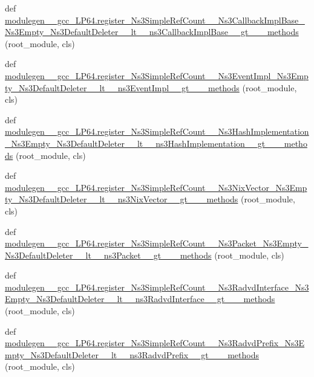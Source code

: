 \begin{DoxyCompactItemize}
\item 
def \hyperlink{namespacemodulegen____gcc__LP64_abad80b77479df17974cc787f14a2406f}{modulegen\+\_\+\+\_\+gcc\+\_\+\+L\+P64.\+register\+\_\+\+Ns3\+Simple\+Ref\+Count\+\_\+\+\_\+\+Ns3\+Callback\+Impl\+Base\+\_\+\+Ns3\+Empty\+\_\+\+Ns3\+Default\+Deleter\+\_\+\+\_\+lt\+\_\+\+\_\+ns3\+Callback\+Impl\+Base\+\_\+\+\_\+gt\+\_\+\+\_\+\+\_\+methods} (root\+\_\+module, cls)
\item 
def \hyperlink{namespacemodulegen____gcc__LP64_a0545c365b0db77cf144c477216b1292c}{modulegen\+\_\+\+\_\+gcc\+\_\+\+L\+P64.\+register\+\_\+\+Ns3\+Simple\+Ref\+Count\+\_\+\+\_\+\+Ns3\+Event\+Impl\+\_\+\+Ns3\+Empty\+\_\+\+Ns3\+Default\+Deleter\+\_\+\+\_\+lt\+\_\+\+\_\+ns3\+Event\+Impl\+\_\+\+\_\+gt\+\_\+\+\_\+\+\_\+methods} (root\+\_\+module, cls)
\item 
def \hyperlink{namespacemodulegen____gcc__LP64_a38845cc78a4819d6d5632f27e6fd34d9}{modulegen\+\_\+\+\_\+gcc\+\_\+\+L\+P64.\+register\+\_\+\+Ns3\+Simple\+Ref\+Count\+\_\+\+\_\+\+Ns3\+Hash\+Implementation\+\_\+\+Ns3\+Empty\+\_\+\+Ns3\+Default\+Deleter\+\_\+\+\_\+lt\+\_\+\+\_\+ns3\+Hash\+Implementation\+\_\+\+\_\+gt\+\_\+\+\_\+\+\_\+methods} (root\+\_\+module, cls)
\item 
def \hyperlink{namespacemodulegen____gcc__LP64_a965e9b7942715fc406cf9c83246b2bcb}{modulegen\+\_\+\+\_\+gcc\+\_\+\+L\+P64.\+register\+\_\+\+Ns3\+Simple\+Ref\+Count\+\_\+\+\_\+\+Ns3\+Nix\+Vector\+\_\+\+Ns3\+Empty\+\_\+\+Ns3\+Default\+Deleter\+\_\+\+\_\+lt\+\_\+\+\_\+ns3\+Nix\+Vector\+\_\+\+\_\+gt\+\_\+\+\_\+\+\_\+methods} (root\+\_\+module, cls)
\item 
def \hyperlink{namespacemodulegen____gcc__LP64_ad03a2df5680530337afef71c06f6d20d}{modulegen\+\_\+\+\_\+gcc\+\_\+\+L\+P64.\+register\+\_\+\+Ns3\+Simple\+Ref\+Count\+\_\+\+\_\+\+Ns3\+Packet\+\_\+\+Ns3\+Empty\+\_\+\+Ns3\+Default\+Deleter\+\_\+\+\_\+lt\+\_\+\+\_\+ns3\+Packet\+\_\+\+\_\+gt\+\_\+\+\_\+\+\_\+methods} (root\+\_\+module, cls)
\item 
def \hyperlink{namespacemodulegen____gcc__LP64_a6ce9c733406056a9773f55e3ecaf7c5f}{modulegen\+\_\+\+\_\+gcc\+\_\+\+L\+P64.\+register\+\_\+\+Ns3\+Simple\+Ref\+Count\+\_\+\+\_\+\+Ns3\+Radvd\+Interface\+\_\+\+Ns3\+Empty\+\_\+\+Ns3\+Default\+Deleter\+\_\+\+\_\+lt\+\_\+\+\_\+ns3\+Radvd\+Interface\+\_\+\+\_\+gt\+\_\+\+\_\+\+\_\+methods} (root\+\_\+module, cls)
\item 
def \hyperlink{namespacemodulegen____gcc__LP64_ae7283bb8e17684bbb914dd54642b941d}{modulegen\+\_\+\+\_\+gcc\+\_\+\+L\+P64.\+register\+\_\+\+Ns3\+Simple\+Ref\+Count\+\_\+\+\_\+\+Ns3\+Radvd\+Prefix\+\_\+\+Ns3\+Empty\+\_\+\+Ns3\+Default\+Deleter\+\_\+\+\_\+lt\+\_\+\+\_\+ns3\+Radvd\+Prefix\+\_\+\+\_\+gt\+\_\+\+\_\+\+\_\+methods} (root\+\_\+module, cls)

\end{DoxyCompactItemize}
